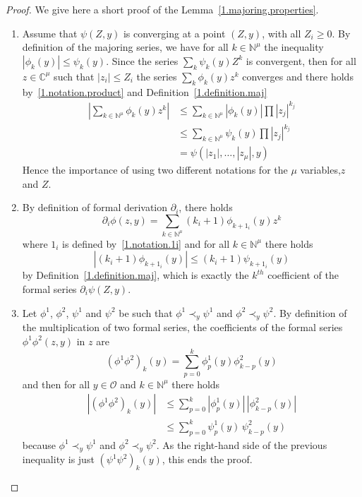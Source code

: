 \documentclass[AHL,Unicode,longabstracts,published]{cedram}
\theoremstyle{plain}
\newcommand*\Cbb{{\mathbb C}}%
\newcommand*\N{{\mathbb N}}
\newcommand{\dptl}{\partial}%
\begin{document}
\begin{proof}
We give here a short proof of the Lemma~\ref{1.majoring.properties}.
\begin{enumerate}

\item Assume that $\psi(Z,y)$ is converging at a point $(Z,y)$, with all $Z_i \geq 0$. By definition of the majoring series, we have for all $k\in\N^{\mu}$ the inequality $ |\phi_{k}(y)| \leq \psi_{k}(y) $. Since the series $\sum_{k} \psi_{k}(y)Z^{k}$ is convergent, then for all $z\in\Cbb^{\mu}$ such that $|z_i| \leq Z_i$ the series $\sum_{k} \phi_{k}(y) z^{k}$ converges and there holds by~\eqref{1.notation.product} and Definition~\ref{1.definition.maj}
\begin{align*}
\left| \sum_{k\in\N^{\mu}} \phi_{k}(y) z^{k} \right| & \leq \sum_{k\in\N^{\mu}} |\phi_{k}(y)| \prod |z_j|^{k_j} \\
& \leq \sum_{k\in\N^{\mu}} \psi_{k}(y) \prod |z_j|^{k_j} \\
& = \psi(|z_1|,\ldots,|z_{\mu}|,y)
\end{align*}
Hence the importance of using two different notations for the $\mu$ variables,\linebreak$z$ and $Z$.

\item By definition of formal derivation $\dptl_{i}$, there holds
\[
\dptl_{i}\phi(z,y) = \sum_{k\in\N^{\mu}} (k_i+1) \phi_{k+1_{i}}(y) z^{k}
\]
where $1_{i}$ is defined by~\eqref{1.notation.1i} and for all $k\in\N^{\mu}$ there holds
\[
|(k_i+1) \phi_{k+1_{i}}(y)| \leq (k_i+1) \psi_{k+1_{i}}(y)
\]
by Definition~\ref{1.definition.maj}, which is exactly the $k^{th}$ coefficient of the formal series $\dptl_{i}\psi(Z,y)$.

\item Let $\phi^1$, $\phi^2$, $\psi^1$ and $\psi^2$ be such that $ \phi^1 \prec_{y} \psi^1$ and $ \phi^2 \prec_{y} \psi^2 $. By definition of the multiplication of two formal series, the coefficients of the formal series $\phi^1\phi^2(z,y)$ in $z$ are
\[
(\phi^1\phi^2)_{k}(y) = \sum_{p=0}^{k} \phi^1_{p}(y)\phi^2_{k-p}(y)
\]
and then for all $y\in\mathcal{O}$ and $k\in\N^{\mu}$ there holds
\begin{align*}
\left|(\phi^1\phi^2)_{k}(y)\right| & \leq \sum_{p=0}^{k} \left|\phi^1_{p}(y)\right| \,\left|\phi^2_{k-p}(y)\right| \\
& \leq \sum_{p=0}^{k} \psi^1_{p}(y) \,\psi^2_{k-p}(y)
\end{align*}
because $\phi^{1} \prec_{y} \psi^{1}$ and $\phi^2 \prec_y \psi^2$. As the right-hand side of the previous inequality is just $(\psi^1\psi^2)_k(y)$, this ends the proof.


\end{enumerate}
\end{proof}
\end{document}
